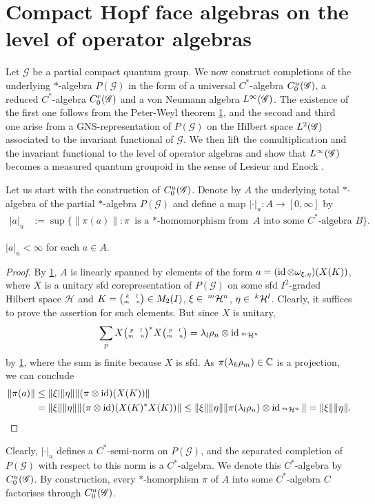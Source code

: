 \section{Compact Hopf face algebras on the level of operator algebras}


Let $\mathscr{G}$ be a partial compact quantum group. We now construct
completions of the underlying $*$-algebra $P(\mathscr{G})$ in the form
of a universal $C^{*}$-algebra $\CuG$, a reduced $C^{*}$-algebra
$\CrG$ and a von Neumann algebra $\LGinf$. The existence of the first
one follows from the Peter-Weyl theorem \ref{}, and the second and
third one arise from a GNS-representation of $P(\mathscr{G})$ on the
Hilbert space $\LGtwo$ associated to the invariant functional of
$\mathscr{G}$.  We then lift the comultiplication and the invariant
functional to the level of operator algebras and show that $\LGinf$
becomes a measured quantum groupoid in the sense of Lesieur \cite{}
and Enock \cite{}.

Let us start with the construction of $\CuG$. Denote by $A$ the
underlying total $*$-algebra of the partial $*$-algebra
$P(\mathscr{G})$ and define a map $|\cdot |_{u} \colon A \to [0,\infty]$ by
\begin{align*}
  |a|_{u}&:= \sup \{ \|\pi(a)\| : \pi \text{ is a $*$-homomorphism
    from } A \text{ into some $C^{*}$-algebra } B\}.
\end{align*}
\begin{Lem}
  $|a|_{u}<\infty$ for each $a \in A$. 
\end{Lem}
\begin{proof}
  By \ref{}, $A$ is linearly spanned by elements of the form $a=(\id \otimes
  \omega_{\xi,\eta})(X(K))$, where $X$ is a unitary sfd
  corepresentation of $P(\mathscr{G})$ on some sfd $I^{2}$-graded
  Hilbert space $\mathcal{H}$ and $K=\pmat{k}{l}{m}{n}\in M_{2}(I)$,
  $\xi\in \Gru{\mathcal{H}}{m}{n}$, $\eta\in \Gru{\mathcal{H}}{k}{l}$.
  Clearly, it suffices to prove the assertion for such elements. But
  since $X$ is unitary, 
  \begin{align*}
    \sum_{p}X\pmat{p}{l}{m}{n}^{*} X\pmat{p}{l}{m}{n}  = \lambda_{l}\rho_{n}
    \otimes \id_{\Gru{\mathcal{H}}{m}{n}}
  \end{align*}
  by \ref{}, where the sum is finite because $X$ is sfd. As
  $\pi(\lambda_{k}\rho_{m})\in \C$ is a projection, we can conclude
  \begin{align*}
    \|\pi(a)\| &\leq \| \xi| \|\eta\| \|(\pi \otimes \id)(X(K))\| \\
    &=\|\xi\|\|\eta\| \|(\pi \otimes \id)(X(K)^{*}X(K))\| \leq
    \|\xi\|\|\eta\| \|\pi(\lambda_{l}\rho_{n}) \otimes
    \id_{\Gru{\mathcal{H}}{m} {n}}\| = \|\xi\|\|\eta\|.  
  \end{align*}
\end{proof}
Clearly, $|\cdot|_{u}$ defines a $C^{*}$-semi-norm on
$P(\mathscr{G})$, and the separated  completion of $P(\mathscr{G})$
with respect to this norm is a $C^{*}$-algebra. We denote this
$C^{*}$-algebra by $\CuG$. By construction,   every $*$-homorphism $\pi$
of $A$ into some $C^{*}$-algebra $C$ factorises through
$\CuG$. 

